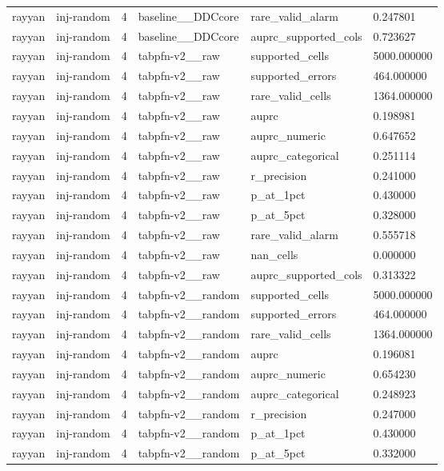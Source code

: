 \begin{tabular}{llllll}
rayyan & inj-random & 4 & baseline\_\_DDCcore & rare\_valid\_alarm & 0.247801 \\
rayyan & inj-random & 4 & baseline\_\_DDCcore & auprc\_supported\_cols & 0.723627 \\
rayyan & inj-random & 4 & tabpfn-v2\_\_raw & supported\_cells & 5000.000000 \\
rayyan & inj-random & 4 & tabpfn-v2\_\_raw & supported\_errors & 464.000000 \\
rayyan & inj-random & 4 & tabpfn-v2\_\_raw & rare\_valid\_cells & 1364.000000 \\
rayyan & inj-random & 4 & tabpfn-v2\_\_raw & auprc & 0.198981 \\
rayyan & inj-random & 4 & tabpfn-v2\_\_raw & auprc\_numeric & 0.647652 \\
rayyan & inj-random & 4 & tabpfn-v2\_\_raw & auprc\_categorical & 0.251114 \\
rayyan & inj-random & 4 & tabpfn-v2\_\_raw & r\_precision & 0.241000 \\
rayyan & inj-random & 4 & tabpfn-v2\_\_raw & p\_at\_1pct & 0.430000 \\
rayyan & inj-random & 4 & tabpfn-v2\_\_raw & p\_at\_5pct & 0.328000 \\
rayyan & inj-random & 4 & tabpfn-v2\_\_raw & rare\_valid\_alarm & 0.555718 \\
rayyan & inj-random & 4 & tabpfn-v2\_\_raw & nan\_cells & 0.000000 \\
rayyan & inj-random & 4 & tabpfn-v2\_\_raw & auprc\_supported\_cols & 0.313322 \\
rayyan & inj-random & 4 & tabpfn-v2\_\_random & supported\_cells & 5000.000000 \\
rayyan & inj-random & 4 & tabpfn-v2\_\_random & supported\_errors & 464.000000 \\
rayyan & inj-random & 4 & tabpfn-v2\_\_random & rare\_valid\_cells & 1364.000000 \\
rayyan & inj-random & 4 & tabpfn-v2\_\_random & auprc & 0.196081 \\
rayyan & inj-random & 4 & tabpfn-v2\_\_random & auprc\_numeric & 0.654230 \\
rayyan & inj-random & 4 & tabpfn-v2\_\_random & auprc\_categorical & 0.248923 \\
rayyan & inj-random & 4 & tabpfn-v2\_\_random & r\_precision & 0.247000 \\
rayyan & inj-random & 4 & tabpfn-v2\_\_random & p\_at\_1pct & 0.430000 \\
rayyan & inj-random & 4 & tabpfn-v2\_\_random & p\_at\_5pct & 0.332000 \\

\end{tabular}
